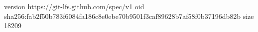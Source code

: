 version https://git-lfs.github.com/spec/v1
oid sha256:fab2f50b783f6084fa186c8e0ebe70b9501f3caf89628b7af58f0b37196db82b
size 18209

